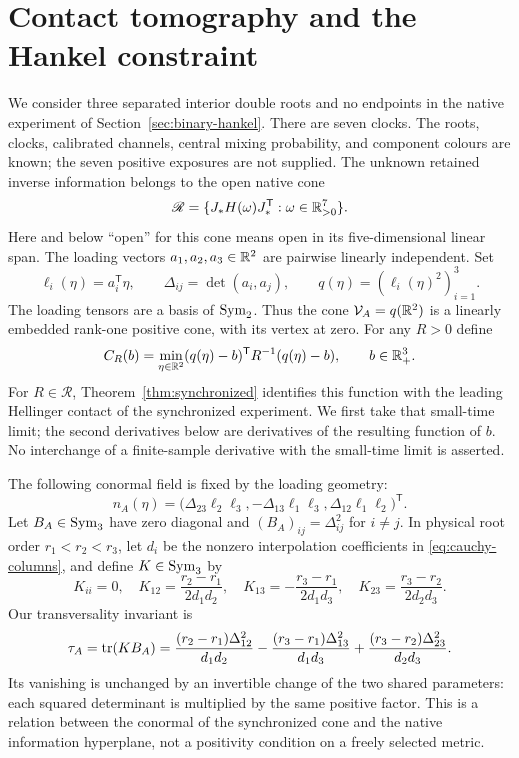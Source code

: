 \section{Contact tomography and the Hankel constraint}\label{sec:tomography}
We consider three separated interior double roots and no endpoints in the native experiment of Section~\ref{sec:binary-hankel}. There are seven clocks. The roots, clocks, calibrated channels, central mixing probability, and component colours are known; the seven positive exposures are not supplied. The unknown retained inverse information belongs to the open native cone
\[
 \mathscr R=\{J_*H(\omega)J_*^{\mathsf T}:\omega\in\mathbb R_{>0}^7\}.
\]
Here and below ``open'' for this cone means open in its five-dimensional linear span. The loading vectors $a_1,a_2,a_3\in\mathbb R^2$ are pairwise linearly independent. Set
\[
 \ell_i(\eta)=a_i^{\mathsf T}\eta,\qquad
 \Delta_{ij}=\det(a_i,a_j),\qquad q(\eta)=(\ell_i(\eta)^2)_{i=1}^3.
\]
The loading tensors are a basis of $\operatorname{Sym}_2$. Thus the cone $\mathcal V_A=q(\mathbb R^2)$ is a linearly embedded rank-one positive cone, with its vertex at zero. For any $R>0$ define
\begin{equation}\label{eq:tomography-contact}
 C_R(b)=\min_{\eta\in\mathbb R^2}(q(\eta)-b)^{\mathsf T}R^{-1}(q(\eta)-b),
 \qquad b\in\mathbb R_+^3.
\end{equation}
For $R\in\mathscr R$, Theorem~\ref{thm:synchronized} identifies this function with the leading Hellinger contact of the synchronized experiment. We first take that small-time limit; the second derivatives below are derivatives of the resulting function of $b$. No interchange of a finite-sample derivative with the small-time limit is asserted.

The following conormal field is fixed by the loading geometry:
\begin{equation}\label{eq:conormal}
 n_A(\eta)=\big(\Delta_{23}\ell_2\ell_3,
              -\Delta_{13}\ell_1\ell_3,
               \Delta_{12}\ell_1\ell_2\big)^{\mathsf T}.
\end{equation}
Let $B_A\in\operatorname{Sym}_3$ have zero diagonal and $(B_A)_{ij}=\Delta_{ij}^2$ for $i\ne j$. In physical root order $r_1<r_2<r_3$, let $d_i$ be the nonzero interpolation coefficients in \eqref{eq:cauchy-columns}, and define $K\in\operatorname{Sym}_3$ by
\begin{equation}\label{eq:hankel-annihilator}
 K_{ii}=0,\quad K_{12}=\frac{r_2-r_1}{2d_1d_2},\quad
 K_{13}=-\frac{r_3-r_1}{2d_1d_3},\quad
 K_{23}=\frac{r_3-r_2}{2d_2d_3}.
\end{equation}
Our transversality invariant is
\begin{equation}\label{eq:tau}
 \tau_A=\operatorname{tr}(KB_A)
 =\frac{(r_2-r_1)\Delta_{12}^2}{d_1d_2}
  -\frac{(r_3-r_1)\Delta_{13}^2}{d_1d_3}
  +\frac{(r_3-r_2)\Delta_{23}^2}{d_2d_3}.
\end{equation}
Its vanishing is unchanged by an invertible change of the two shared parameters: each squared determinant is multiplied by the same positive factor. This is a relation between the conormal of the synchronized cone and the native information hyperplane, not a positivity condition on a freely selected metric.

